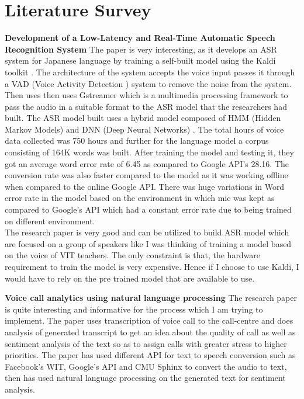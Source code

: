 \documentclass[11pt,a4paper]{article}
\begin{document}
	
	\section{Literature Survey}
	 
	\textbf{ Development of a Low-Latency and Real-Time
	 Automatic Speech Recognition System} \citep{leow2020development}
  The paper is very interesting, as it develops an ASR system for Japanese language by training a self-built model using the Kaldi toolkit \citep{povey2011kaldi} . The architecture of the system accepts the voice input passes it through a VAD (Voice Activity Detection ) system to remove the noise from the system. Then uses then uses Gstreamer which is a multimedia processing framework to pass the audio in a suitable format to the ASR model that the researchers had built. The ASR model built uses a hybrid model composed of HMM (Hidden Markov Models) and DNN (Deep Neural Networks) . The total hours of voice data collected was 750 hours and further for the language model a corpus consisting of 164K words was built. After training the model and testing it, they got an average word error rate of 6.45 as compared to Google API's 28.16. The conversion rate was also faster compared to the model as it was working offline when compared to the online Google API.  There was huge variations in Word error rate in the model based on the environment in which mic was kept as compared to Google's API which had a constant error rate due to being trained on different environment. \\
  The research paper is very good and can be utilized to build ASR model which are focused on a group of speakers like I was thinking of training a model based on the voice of VIT teachers. The only constraint is that, the hardware requirement to train the model is very expensive. Hence if I choose to use Kaldi, I would have to rely on the pre trained model that are available to use.
	 
	\textbf{ Voice call analytics using natural language processing} \citep{sudarsan2019voice}
	The research paper is quite interesting and informative for the process which I am trying to implement. The paper uses transcription of voice call to the call-centre and does analysis of generated transcript to get an idea about the quality of call as well as sentiment analysis of the text so as to assign calls with greater stress to higher priorities. The paper has used different API for text to speech conversion such as Facebook's WIT, Google's API and CMU Sphinx to convert the audio to text, then has used natural language processing on the generated text for sentiment analysis.
	
\end{document}
